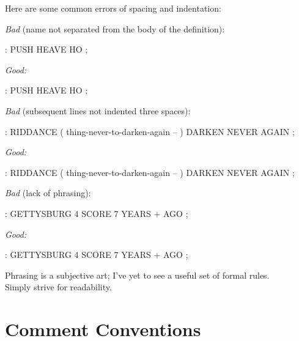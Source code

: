 %
Here are some common errors of spacing and indentation:

\goodbreak\bigskip\noindent
\emph{Bad} (name not separated from the body of the definition):
\begin{Code}
: PUSH HEAVE HO ;
\end{Code}
\emph{Good:}
\begin{Code}
: PUSH   HEAVE HO ;
\end{Code}
\emph{Bad} (subsequent lines not indented three spaces):
\begin{Code}
: RIDDANCE  ( thing-never-to-darken-again -- )
DARKEN  NEVER AGAIN ;
\end{Code}
\emph{Good:}
\begin{Code}
: RIDDANCE  ( thing-never-to-darken-again -- )
   DARKEN  NEVER AGAIN ;
\end{Code}
\emph{Bad} (lack of phrasing):
\begin{Code}
: GETTYSBURG   4 SCORE 7 YEARS + AGO ;
\end{Code}
\goodbreak\noindent
\emph{Good:}
\begin{Code}
: GETTYSBURG   4 SCORE   7 YEARS +   AGO ;
\end{Code}
Phrasing is a subjective art;
I've yet to see a useful set of formal rules.\\
Simply strive for readability.%
%
%
%

\section{Comment Conventions}%
%

